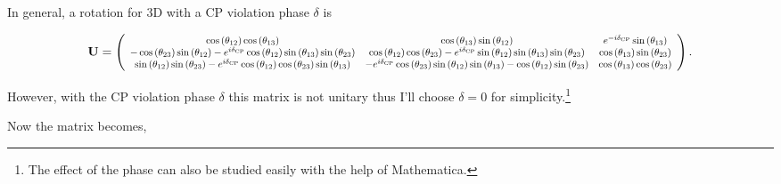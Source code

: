 \documentclass{tufte-handout}
\begin{document}
In general, a rotation for 3D with a CP violation phase $\delta$ is

\newcommand\scalemath[2]{\scalebox{#1}{\mbox{\ensuremath{\displaystyle #2}}}}

\begin{equation*}
\mathbf{U} = \left(
\scalemath{0.8}{
\begin{array}{ccc}
 \cos \left(\theta _{12}\right) \cos \left(\theta _{13}\right) & \cos \left(\theta _{13}\right) \sin \left(\theta _{12}\right) & e^{-i \delta _{\text{CP}}} \sin \left(\theta _{13}\right) \\
 -\cos \left(\theta _{23}\right) \sin \left(\theta _{12}\right)-e^{i \delta _{\text{CP}}} \cos \left(\theta _{12}\right) \sin \left(\theta _{13}\right) \sin \left(\theta _{23}\right) & \cos \left(\theta _{12}\right) \cos \left(\theta _{23}\right)-e^{i \delta _{\text{CP}}} \sin \left(\theta _{12}\right) \sin \left(\theta _{13}\right) \sin \left(\theta _{23}\right) & \cos \left(\theta _{13}\right) \sin \left(\theta _{23}\right) \\
 \sin \left(\theta _{12}\right) \sin \left(\theta _{23}\right)-e^{i \delta _{\text{CP}}} \cos \left(\theta _{12}\right) \cos \left(\theta _{23}\right) \sin \left(\theta _{13}\right) & -e^{i \delta _{\text{CP}}} \cos \left(\theta _{23}\right) \sin \left(\theta _{12}\right) \sin \left(\theta _{13}\right)-\cos \left(\theta _{12}\right) \sin \left(\theta _{23}\right) & \cos \left(\theta _{13}\right) \cos \left(\theta _{23}\right) \\
\end{array}
}
\right).
\end{equation*}


However, with the CP violation phase $\delta$ this matrix is not unitary thus I'll choose $\delta=0$ for simplicity.\footnote{The effect of the phase can also be studied easily with the help of Mathematica.}

Now the matrix becomes,
\end{document}
